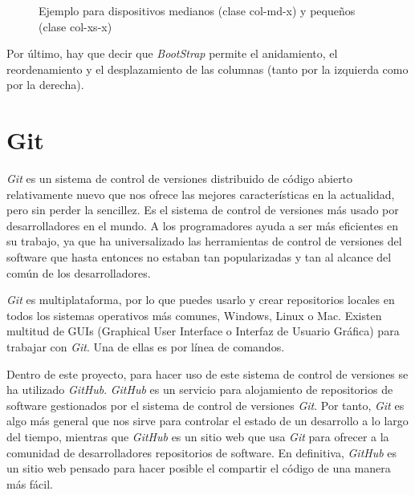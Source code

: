 \documentclass[a4paper, 12pt]{book}
\begin{document}
\begin{figure}[htbp] 
  \label{figura:bootstrap1}
  \centering
  \caption{Ejemplo para dispositivos medianos (clase col-md-x) y peque\~nos (clase col-xs-x)}
\end{figure}

Por \'ultimo, hay que decir que \textit{BootStrap} permite el anidamiento, el reordenamiento y el desplazamiento de las columnas 
(tanto por la izquierda como por la derecha).

\section{Git}
\label{sec:git}
\textit{Git} es un sistema de control de versiones distribuido de c\'odigo abierto relativamente nuevo que nos ofrece las mejores caracter\'isticas en la 
actualidad, pero sin perder la sencillez. Es el sistema de control de versiones m\'as usado por desarrolladores en el mundo. 
A los programadores ayuda a ser m\'as eficientes en su trabajo, ya que ha universalizado las herramientas de control de versiones del software que 
hasta entonces no estaban tan popularizadas y tan al alcance del com\'un de los desarrolladores.

\textit{Git} es multiplataforma, por lo que puedes usarlo y crear repositorios locales en todos los sistemas operativos m\'as comunes, Windows, Linux o Mac. 
Existen multitud de GUIs (Graphical User Interface o Interfaz de Usuario Gr\'afica) para trabajar con \textit{Git}. Una de ellas es por l\'inea de comandos.

Dentro de este proyecto, para hacer uso de este sistema de control de versiones se ha utilizado \textit{GitHub}. \textit{GitHub} es un servicio para alojamiento de 
repositorios de software gestionados por el sistema de control de versiones \textit{Git}. Por tanto, \textit{Git} es algo m\'as general que nos sirve para controlar 
el estado de un desarrollo a lo largo del tiempo, mientras que \textit{GitHub} es un sitio web que usa \textit{Git} para ofrecer a la comunidad de desarrolladores 
repositorios de software. En definitiva, \textit{GitHub} es un sitio web pensado para hacer posible el compartir el c\'odigo de una manera m\'as f\'acil.
\end{document}
